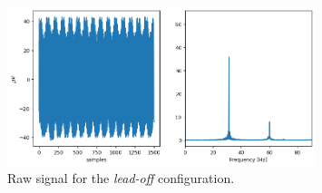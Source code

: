 \begin{figure}
\begin{centering}
\includegraphics[width=0.8\textwidth]{Cap2/Figures/imedances_signal.png}
\par\end{centering}
\caption{Raw signal for the \textit{lead-off} configuration.}
\label{fig:bci_drivers}
\end{figure}